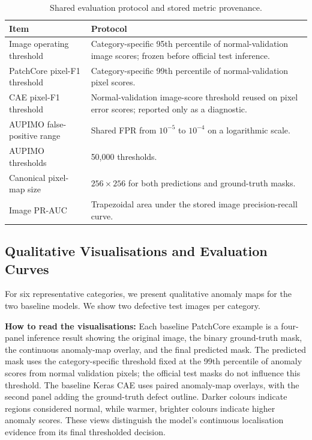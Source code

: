 \documentclass[11pt, a4paper]{article}
\begin{document}
\begin{table}[H]
\centering
\caption{Shared evaluation protocol and stored metric provenance.}
\label{tab:appendix_metric_protocol}
\begin{tabular}{p{} p{}}
\toprule
\textbf{Item} & \textbf{Protocol} \\
\midrule
Image operating threshold & Category-specific 95th percentile of normal-validation image scores; frozen before official test inference. \\
PatchCore pixel-F1 threshold & Category-specific 99th percentile of normal-validation pixel scores. \\
CAE pixel-F1 threshold & Normal-validation image-score threshold reused on pixel error scores; reported only as a diagnostic. \\
AUPIMO false-positive range & Shared FPR from $10^{-5}$ to $10^{-4}$ on a logarithmic scale. \\
AUPIMO thresholds & 50,000 thresholds. \\
Canonical pixel-map size & $256 \times 256$ for both predictions and ground-truth masks. \\
Image PR-AUC & Trapezoidal area under the stored image precision-recall curve. \\
\bottomrule
\end{tabular}
\end{table}

\clearpage
\subsection*{Qualitative Visualisations and Evaluation Curves}

For six representative categories, we present qualitative anomaly maps for the two baseline models. We show two defective test images per category.

\textbf{How to read the visualisations:} Each baseline PatchCore example is a four-panel inference result showing the original image, the binary ground-truth mask, the continuous anomaly-map overlay, and the final predicted mask. The predicted mask uses the category-specific threshold fixed at the 99th percentile of anomaly scores from normal validation pixels; the official test masks do not influence this threshold. The baseline Keras CAE uses paired anomaly-map overlays, with the second panel adding the ground-truth defect outline. Darker colours indicate regions considered normal, while warmer, brighter colours indicate higher anomaly scores. These views distinguish the model's continuous localisation evidence from its final thresholded decision.
\end{document}
